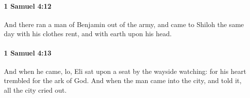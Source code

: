 		\paragraph{1 Samuel 4:12} %
			\label{1SAMUEL-4-12}

			And there ran a man of Benjamin out of the army, and came to Shiloh the same day with his clothes rent, and with earth upon his head.


		\paragraph{1 Samuel 4:13} %
			\label{1SAMUEL-4-13}

			And when he came, lo, Eli sat upon a seat by the wayside watching: for his heart trembled for the ark of God. And when the man came into the city, and told it, all the city cried out.


